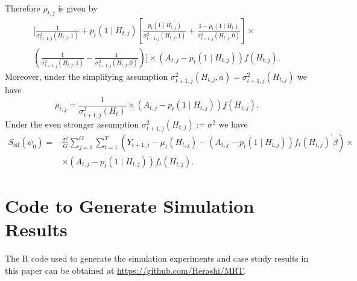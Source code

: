 \documentclass[12pt]{article}
\begin{document}
Therefore $\rho_{t,j}$ is given by
\begin{align*}
\bigg[ \frac{1}{\sigma^2_{t+1,j} (H_{t,j}, 1)} + p_t ( 1 \mid H_{t,j}) \left[  \frac{p_t (1 \mid H_{t,j} )}{\sigma^2_{t+1,j} (H_{t,j}, 1)} + \frac{1-p_t (1 \mid H_t )}{\sigma^2_{t+1,j} (H_{t,j}, 0)} \right] \times \\
\left( \frac{1}{\sigma^2_{t+1,j} (H_{t,j}, 1)}  - \frac{1}{\sigma^2_{t+1,j} (H_{t,j}, 0)} \right)
 \bigg] \times \left( A_{t,j} - p_t (1 \mid H_{t,j}) \right) f(H_{t,j}).
\end{align*}
Moreover, under the simplifying assumption $\sigma^2_{t+1,j} (H_{t,j}, a) = \sigma^2_{t+1,j} (H_{t,j})$ we have
$$
\rho_{t,j} = \frac{1}{\sigma^2_{t+1,j} (H_t)} \times \left( A_{t,j} - p_t (1 \mid H_{t,j}) \right) f(H_{t,j}).
$$
Under the even stronger assumption $\sigma^2_{t+1,j} (H_{t,j}) := \sigma^2$ we have
\begin{align*}
S_{\text{eff}} (\psi_0) =&  \frac{\sigma^2}{G} \sum_{j=1}^G \sum_{t=1}^T \left(Y_{t+1,j} - \mu_t (H_{t,j}) - (A_{t,j} - p_t (1 \mid H_{t,j})) f_t (H_{t,j})^\prime \beta \right) \times \\
&\times (A_{t,j} - p_t (1 \mid H_{t,j})) f_t (H_{t,j}).
\end{align*}

\section{Code to Generate Simulation Results}
The R code used to generate the simulation experiments and case study results in this paper can be obtained at
\href{https://github.com/Herashi/MRT}{https://github.com/Herashi/MRT}.
\end{document}
